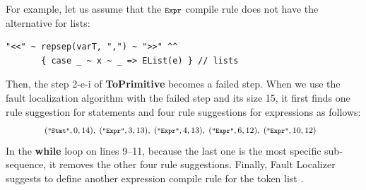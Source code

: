 For example, let us assume that the \( \texttt{\footnotesize Expr} \) compile rule
does not have the alternative for lists:
\begin{lstlisting}[style=myScalastyle]
  "<<" ~ repsep(varT, ",") ~ ">>" ^^
       { case _ ~ x ~ _ => EList(e) } // lists
\end{lstlisting}
Then, the step 2-e-i of \textbf{ToPrimitive} becomes a failed step.
When we use the fault localization algorithm with the failed step and
its size 15, it first finds one rule suggestion for statements and four
rule suggestions for expressions as follows:
\[
\footnotesize
\! \! \! \!
  \begin{array}{c}
    (\texttt{\scriptsize"Stmt"}, 0, 14), \;
    (\texttt{\scriptsize"Expr"}, 3, 13), \;
    (\texttt{\scriptsize"Expr"}, 4, 13), \;
    (\texttt{\scriptsize"Expr"}, 6, 12), \;
    (\texttt{\scriptsize"Expr"}, 10, 12)
  \end{array}
\]
In the \textbf{\small while} loop on lines 9--11, because the last one
is the most specific sub-sequence, it removes the other four
rule suggestions. Finally, \textsf{Fault Localizer} suggests to define
another expression compile rule for the token list \hint{}.
